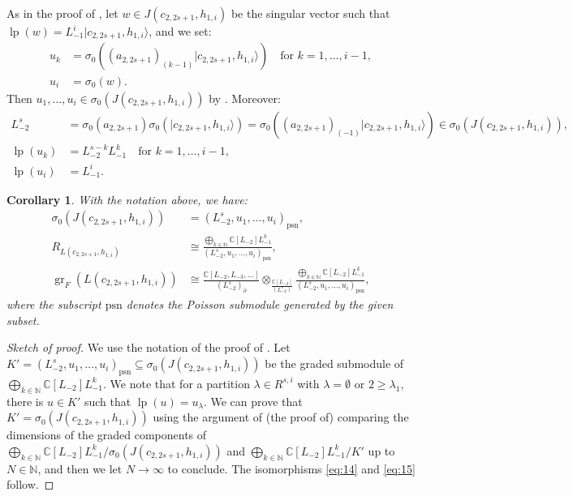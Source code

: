 \documentclass[a4paper, 12pt, reqno]{amsart}
\newtheorem{corollary}[theorem]{Corollary}
\theoremstyle{remark}
\DeclareMathOperator{\gr}{gr}
\DeclareMathOperator{\lp}{lp}
\newcommand{\psn}{{\mathrm{psn}}}
\begin{document}
As in the proof of , let $w \in J(c_{2, 2s + 1}, h_{1, i})$ be the singular vector such that $\lp(w) = L_{-1}^i|c_{2, 2s + 1}, h_{1, i}\rangle$, and we set:
\begin{align*}
  u_k &= \sigma_0((a_{2, 2s + 1})_{(k - 1)}|c_{2, 2s + 1}, h_{1, i}\rangle) \quad \text{for $k = 1, \dots, i - 1$}, \\
  u_i &= \sigma_0(w).
\end{align*}
Then $u_1, \dots, u_i \in \sigma_0(J(c_{2, 2s + 1}, h_{1, i}))$ by .
Moreover:
\begin{align*}
  L_{-2}^s &= \sigma_0(a_{2, 2s + 1})\sigma_0(|c_{2, 2s + 1}, h_{1, i}\rangle) = \sigma_0((a_{2, 2s + 1})_{(-1)}|c_{2, 2s + 1}, h_{1, i}\rangle) \in \sigma_0(J(c_{2, 2s + 1}, h_{1, i})), \\
  \lp(u_k) &= L_{-2}^{s - k}L_{-1}^k \quad \text{for $k = 1, \dots, i - 1$}, \\
  \lp(u_i) &= L_{-1}^i.
\end{align*}

\begin{corollary}
  \label{crl:1}
  With the notation above, we have:
  \begin{align}
    \label{eq:13}
    \sigma_0(J(c_{2, 2s + 1}, h_{1, i})) &= (L_{-2}^s, u_1, \dots, u_i)_\psn, \\
    \label{eq:14}
    R_{L(c_{2, 2s + 1}, h_{1, i})} &\cong \frac{\bigoplus_{k \in \mathbb{N}}\mathbb{C}[L_{-2}]L_{-1}^k}{(L_{-2}^s, u_1, \dots, u_i)_\psn}, \\
    \label{eq:15}
    \gr_F(L(c_{2, 2s + 1}, h_{1, i})) &\cong \frac{\mathbb{C}[L_{-2}, L_{-3}, \dots]}{(L_{-2}^s)_\partial} \otimes_{\frac{\mathbb{C}[L_{-2}]}{(L_{-2}^s)}} \frac{\bigoplus_{k \in \mathbb{N}}\mathbb{C}[L_{-2}]L_{-1}^k}{(L_{-2}^s, u_1, \dots, u_i)_\psn},
  \end{align}
  where the subscript $\psn$ denotes the Poisson submodule generated by the given subset.
\end{corollary}

\begin{proof}[Sketch of proof]
  We use the notation of the proof of .
  Let $K' = (L_{-2}^s, u_1, \dots, u_i)_\psn \subseteq \sigma_0(J(c_{2, 2s + 1}, h_{1, i}))$ be the graded submodule of $\bigoplus_{k \in \mathbb{N}}\mathbb{C}[L_{-2}]L_{-1}^k$.
  We note that for a partition $\lambda \in R^{s, i}$ with $\lambda = \emptyset$ or $2 \ge \lambda_1$, there is $u \in K'$ such that $\lp(u) = u_\lambda$.
  We can prove that $K' = \sigma_0(J(c_{2, 2s + 1}, h_{1, i}))$ using the argument of (the proof of) \cite[Corollary 4.1]{salazar_pbw_2024} comparing the dimensions of the graded components of $\bigoplus_{k \in \mathbb{N}}\mathbb{C}[L_{-2}]L_{-1}^k/\sigma_0(J(c_{2, 2s + 1}, h_{1, i}))$ and $\bigoplus_{k \in \mathbb{N}}\mathbb{C}[L_{-2}]L_{-1}^k/K'$ up to $N \in \mathbb{N}$, and then we let $N \to \infty$ to conclude.
  The isomorphisms \eqref{eq:14} and \eqref{eq:15} follow.
\end{proof}
\end{document}
